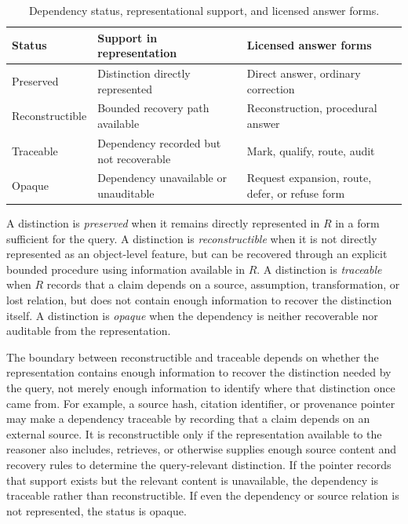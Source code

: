 \documentclass[11pt]{article}
\begin{document}
\begin{table}[h]
\centering
\caption{Dependency status, representational support, and licensed answer forms.}
\label{tab:dependency_status_answer_forms}
\begin{tabular}{lll}
\toprule
\textbf{Status} & \textbf{Support in representation} & \textbf{Licensed answer forms} \\
\midrule
Preserved & Distinction directly represented & Direct answer, ordinary correction \\
Reconstructible & Bounded recovery path available & Reconstruction, procedural answer \\
Traceable & Dependency recorded but not recoverable & Mark, qualify, route, audit \\
Opaque & Dependency unavailable or unauditable & Request expansion, route, defer, or refuse form \\
\bottomrule
\end{tabular}
\end{table}

A distinction is \emph{preserved} when it remains directly represented in $R$ in a form sufficient for the query. A distinction is \emph{reconstructible} when it is not directly represented as an object-level feature, but can be recovered through an explicit bounded procedure using information available in $R$. A distinction is \emph{traceable} when $R$ records that a claim depends on a source, assumption, transformation, or lost relation, but does not contain enough information to recover the distinction itself. A distinction is \emph{opaque} when the dependency is neither recoverable nor auditable from the representation.

The boundary between reconstructible and traceable depends on whether the representation contains enough information to recover the distinction needed by the query, not merely enough information to identify where that distinction once came from. For example, a source hash, citation identifier, or provenance pointer may make a dependency traceable by recording that a claim depends on an external source. It is reconstructible only if the representation available to the reasoner also includes, retrieves, or otherwise supplies enough source content and recovery rules to determine the query-relevant distinction. If the pointer records that support exists but the relevant content is unavailable, the dependency is traceable rather than reconstructible. If even the dependency or source relation is not represented, the status is opaque.
\end{document}
